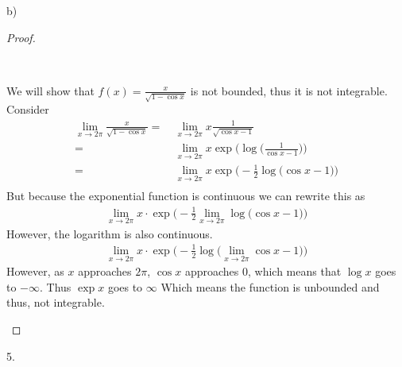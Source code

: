 \documentclass[11pt]{article}
\newcommand{\nskip}{\\ \bigskip}
\newenvironment{myproof}
{\begin{proof} \begin{adjustwidth}{3em}{0pt}$ $\par\nobreak\ignorespaces}
{\end{adjustwidth} \end{proof}}
\begin{document}
\begin{flushleft}
b)

\begin{myproof}
We will show that $f(x) = \frac{x}{\sqrt{1-\cos x}}$ is not bounded, thus it is not integrable. \nskip
Consider
\begin{align*}
\lim_{x \to 2 \pi} \frac{x}{\sqrt{1-\cos x}} = & \ \lim_{x \to 2 \pi} x \frac{1}{\sqrt{\cos x - 1}} \\
= & \ \lim_{x \to 2 \pi} x \exp \Big( \log \Big( \frac{1}{\cos x - 1} \Big) \Big) \\
= & \ \lim_{x \to  2 \pi} x \exp \Big( -\frac12  \log \Big(\cos x - 1 \Big) \Big) \\
\end{align*}
But because the exponential function is continuous we can rewrite this as
\begin{align*}
\lim_{x \to 2 \pi} x \cdot \exp \Big(- \frac12 \lim_{x \to 2 \pi} \log \Big (\cos x -1 \Big) \Big)
\end{align*}
However, the logarithm is also continuous.
\begin{align*}
\lim_{x \to 2 \pi} x \cdot \exp \Big(- \frac12  \log \Big (\lim_{x \to 2 \pi} \cos x -1 \Big) \Big)
\end{align*}
However, as $x$ approaches $2 \pi$, $\cos x$ approaches $0$, which means that $ \log x$ goes to $-\infty$. Thus $\exp x$ goes to $\infty$ Which means the function is unbounded and thus, not integrable.
\end{myproof}

\newpage

5.


\end{flushleft}
\end{document}
